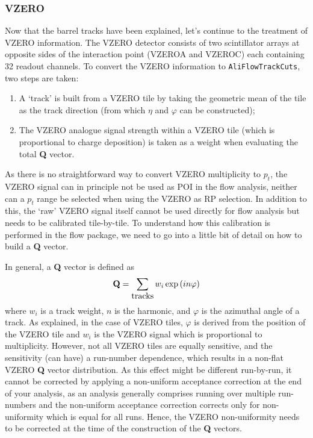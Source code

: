 \documentclass[a4paper]{book}
\numberwithin{equation}{subsection}
\begin{document}
\subsubsection{VZERO}
Now that the barrel tracks have been explained, let's continue to the treatment of VZERO information. The VZERO detector consists of two scintillator arrays at opposite sides of the interaction point (VZEROA and VZEROC) each containing 32 readout channels. To convert the VZERO information to \texttt{AliFlowTrackCuts}, two steps are taken:
\begin{enumerate}
\item A `track' is built from a VZERO tile by taking the geometric mean of the tile as the track direction (from which $\eta$ and $\varphi$ can be constructed);
\item The VZERO analogue signal strength within a VZERO tile (which is proportional to charge deposition) is taken as a weight when evaluating the total \textbf{Q} vector.
\end{enumerate}
As there is no straightforward way to convert VZERO multiplicity to $p_t$, the VZERO signal can in principle not be used as POI in the flow analysis, neither can a $p_t$ range be selected when using the VZERO as RP selection. In addition to this, the `raw' VZERO signal itself cannot be used directly for flow analysis  but needs to be calibrated tile-by-tile. To understand how this calibration is performed in the flow package, we need to go into a little bit of detail on how to build a \textbf{Q} vector. 

In general, a \textbf{Q} vector is defined as
\begin{equation}\label{qvzero}
\mbox{\textbf{Q}} = \sum_{\mbox{tracks}} w_i \exp \left( i n \varphi \right)
\end{equation}
where $w_i$ is a track weight, $n$ is the harmonic, and $\varphi$ is the azimuthal angle of a track.  As explained, in the case of VZERO tiles, $\varphi$ is derived from the position of the VZERO tile and $w_i$ is the VZERO signal which is proportional to multiplicity. However, not all VZERO tiles are equally sensitive, and the sensitivity (can have) a run-number dependence, which results in a non-flat VZERO \textbf{Q} vector distribution. As this effect might be different run-by-run, it cannot be corrected by applying a non-uniform acceptance correction at the end of your analysis, as an analysis generally comprises running over multiple run-numbers and the non-uniform acceptance correction corrects only for non-uniformity which is equal for all runs. Hence, the VZERO non-uniformity needs to be corrected at the time of the construction of the \textbf{Q} vectors.
\end{document}
